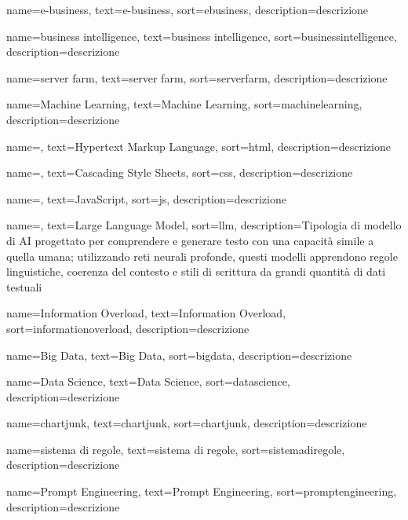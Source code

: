  {
    name=e-business,
    text=e-business,
    sort=ebusiness,
    description={descrizione}
}

 {
    name=business intelligence,
    text=business intelligence,
    sort=businessintelligence,
    description={descrizione}
}

 {
    name=server farm,
    text=server farm,
    sort=serverfarm,
    description={descrizione}
}

 {
    name=Machine Learning,
    text=Machine Learning,
    sort=machinelearning,
    description={descrizione}
}

 {
    name=,
    text=Hypertext Markup Language,
    sort=html,
    description={descrizione}
}

 {
    name=,
    text=Cascading Style Sheets,
    sort=css,
    description={descrizione}
}

 {
    name=,
    text=JavaScript,
    sort=js,
    description={descrizione}
}

 {
    name=,
    text=Large Language Model,
    sort=llm,
    description={Tipologia di modello di AI progettato per comprendere e
    generare testo con una capacità simile a quella umana; utilizzando reti neurali
    profonde, questi modelli apprendono regole linguistiche, coerenza del contesto e
    stili di scrittura da grandi quantità di dati testuali}
}

 {
    name=Information Overload,
    text=Information Overload,
    sort=informationoverload,
    description={descrizione}
}

 {
    name=Big Data,
    text=Big Data,
    sort=bigdata,
    description={descrizione}
}

 {
    name=Data Science,
    text=Data Science,
    sort=datascience,
    description={descrizione}
}

 {
    name=chartjunk,
    text=chartjunk,
    sort=chartjunk,
    description={descrizione}
}

 {
    name=sistema di regole,
    text=sistema di regole,
    sort=sistemadiregole,
    description={descrizione}
}

 {
    name=Prompt Engineering,
    text=Prompt Engineering,
    sort=promptengineering,
    description={descrizione}
}

